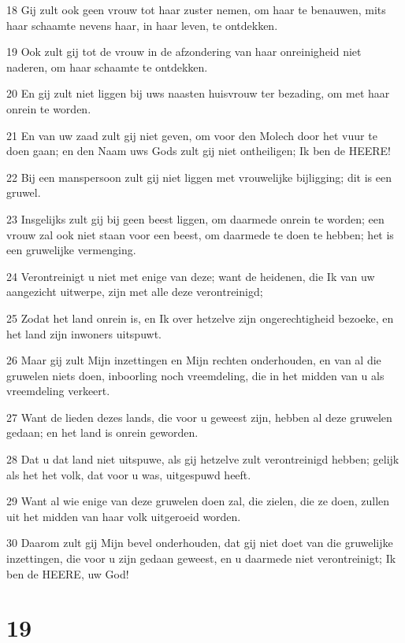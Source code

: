 \par 18 Gij zult ook geen vrouw tot haar zuster nemen, om haar te benauwen, mits haar schaamte nevens haar, in haar leven, te ontdekken.
\par 19 Ook zult gij tot de vrouw in de afzondering van haar onreinigheid niet naderen, om haar schaamte te ontdekken.
\par 20 En gij zult niet liggen bij uws naasten huisvrouw ter bezading, om met haar onrein te worden.
\par 21 En van uw zaad zult gij niet geven, om voor den Molech door het vuur te doen gaan; en den Naam uws Gods zult gij niet ontheiligen; Ik ben de HEERE!
\par 22 Bij een manspersoon zult gij niet liggen met vrouwelijke bijligging; dit is een gruwel.
\par 23 Insgelijks zult gij bij geen beest liggen, om daarmede onrein te worden; een vrouw zal ook niet staan voor een beest, om daarmede te doen te hebben; het is een gruwelijke vermenging.
\par 24 Verontreinigt u niet met enige van deze; want de heidenen, die Ik van uw aangezicht uitwerpe, zijn met alle deze verontreinigd;
\par 25 Zodat het land onrein is, en Ik over hetzelve zijn ongerechtigheid bezoeke, en het land zijn inwoners uitspuwt.
\par 26 Maar gij zult Mijn inzettingen en Mijn rechten onderhouden, en van al die gruwelen niets doen, inboorling noch vreemdeling, die in het midden van u als vreemdeling verkeert.
\par 27 Want de lieden dezes lands, die voor u geweest zijn, hebben al deze gruwelen gedaan; en het land is onrein geworden.
\par 28 Dat u dat land niet uitspuwe, als gij hetzelve zult verontreinigd hebben; gelijk als het het volk, dat voor u was, uitgespuwd heeft.
\par 29 Want al wie enige van deze gruwelen doen zal, die zielen, die ze doen, zullen uit het midden van haar volk uitgeroeid worden.
\par 30 Daarom zult gij Mijn bevel onderhouden, dat gij niet doet van die gruwelijke inzettingen, die voor u zijn gedaan geweest, en u daarmede niet verontreinigt; Ik ben de HEERE, uw God!

\chapter{19}

